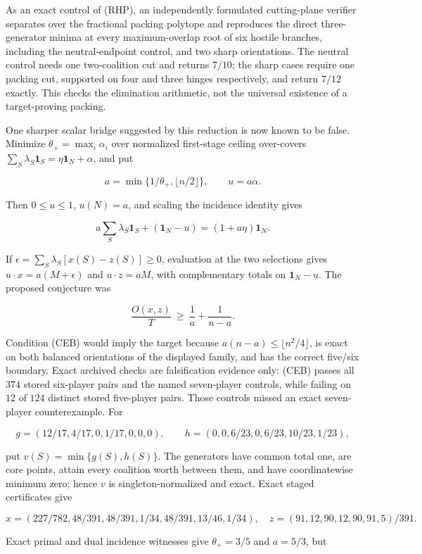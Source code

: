 \documentclass[11pt]{article}
\newcommand{\one}{\mathbf 1}
\begin{document}
As an exact control of (RHP), an independently formulated cutting-plane
verifier separates over the fractional packing polytope and reproduces the
direct three-generator minima at every maximum-overlap root of six hostile
branches, including the neutral-endpoint control, and two sharp orientations.
The neutral control needs one two-coalition cut and returns $7/10$; the sharp
cases require one packing cut, supported on four and three hinges respectively,
and return $7/12$ exactly.  This checks the elimination arithmetic, not the
universal existence of a target-proving packing.

One sharper scalar bridge suggested by this reduction is now known to be
false.  Minimize
$\theta_+=\max_i\alpha_i$ over normalized first-stage ceiling over-covers
$\sum_S\lambda_S\one_S=\eta\one_N+\alpha$, and put

\[
 a=\min\{1/\theta_+,\lfloor n/2\rfloor\},\qquad u=a\alpha.
\]

Then $0\le u\le1$, $u(N)=a$, and scaling the incidence identity gives

\[
 a\sum_S\lambda_S\one_S+(\one_N-u)=(1+a\eta)\one_N.
\]

If $\epsilon=\sum_S\lambda_S[x(S)-z(S)]\ge0$, evaluation at the two
selections gives $u\mathbin\cdot x=a(M+\epsilon)$ and
$u\mathbin\cdot z=aM$, with complementary totals on $\one_N-u$.  The
proposed conjecture was

\[
 \frac{O(x,z)}{T}\ \ge\ \frac1a+\frac1{n-a}.          \tag{CEB}
\]

Condition (CEB) would imply the target because
$a(n-a)\le\lfloor n^2/4\rfloor$, is exact on
both balanced orientations of the displayed family, and has the correct
five/six boundary.  Exact archived checks are falsification evidence only:
(CEB) passes all $374$ stored six-player pairs and the named seven-player
controls, while failing on $12$ of $124$ distinct stored five-player pairs.
Those controls missed an exact seven-player counterexample.  For

\[
 g=(12/17,4/17,0,1/17,0,0,0),\qquad
 h=(0,0,6/23,0,6/23,10/23,1/23),
\]

put $v(S)=\min\{g(S),h(S)\}$.  The generators have common total one, are
core points, attain every coalition worth between them, and have
coordinatewise minimum zero; hence $v$ is singleton-normalized and exact.
Exact staged certificates give

\[
 x=(227/782,48/391,48/391,1/34,48/391,13/46,1/34),
 \quad z=(91,12,90,12,90,91,5)/391.
\]

Exact primal and dual incidence witnesses give $\theta_+=3/5$ and $a=5/3$,
but
\end{document}
